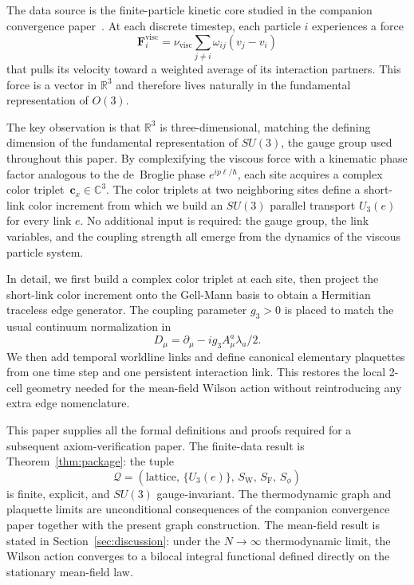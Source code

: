 \documentclass[11pt]{article}
\theoremstyle{remark}
\newcommand{\R}{\mathbb R}
\newcommand{\C}{\mathbb C}
\begin{document}
The data source is the finite-particle kinetic core studied in the companion
convergence paper~\cite{convergence}.
At each discrete timestep, each particle $i$ experiences a force
\[
  \mathbf F^{\mathrm{visc}}_i
  = \nu_{\mathrm{visc}}\sum_{j\neq i}\omega_{ij}(v_j - v_i)
\]
that pulls its velocity toward a weighted average of its interaction partners.
This force is a vector in $\R^3$ and therefore lives naturally in the fundamental
representation of $O(3)$.

The key observation is that $\R^3$ is three-dimensional, matching the defining
dimension of the fundamental representation of $SU(3)$, the gauge group used
throughout this paper.
By complexifying the viscous force with a kinematic phase factor analogous to the
de~Broglie phase $e^{ip\ell/\hbar}$, each site acquires a complex
color triplet~$\mathbf c_x\in\C^3$.
The color triplets at two neighboring sites define a short-link color increment
from which we build an \(SU(3)\) parallel transport \(U_3(e)\) for every link \(e\).
No additional input is required: the gauge group, the link variables, and
the coupling strength all emerge from the dynamics of the viscous particle system.

In detail, we first build a complex color triplet at each site, then project the
short-link color increment onto the Gell-Mann basis to obtain a Hermitian
traceless edge generator. The coupling parameter \(g_3>0\) is placed to match
the usual continuum normalization in
\[
D_\mu=\partial_\mu-ig_3 A_\mu^a\lambda_a/2.
\]
We then add temporal worldline links and define canonical elementary plaquettes
from one time step and one persistent interaction link. This restores the local
2-cell geometry needed for the mean-field Wilson action without
reintroducing any extra edge nomenclature.

This paper supplies all the formal definitions and proofs required for a
subsequent axiom-verification paper.
The finite-data result is Theorem~\ref{thm:package}: the tuple
\[
\mathcal Q = (\text{lattice},\,\{U_3(e)\},\,S_\mathrm W,\,S_\mathrm F,\,S_\phi)
\]
is finite, explicit, and $SU(3)$ gauge-invariant.
The thermodynamic graph and plaquette limits are unconditional consequences of
the companion convergence paper together with the present graph construction.
The mean-field result is stated in Section~\ref{sec:discussion}: under the
$N\to\infty$ thermodynamic limit, the Wilson action converges to a bilocal
integral functional defined directly on the stationary mean-field law.
\end{document}
